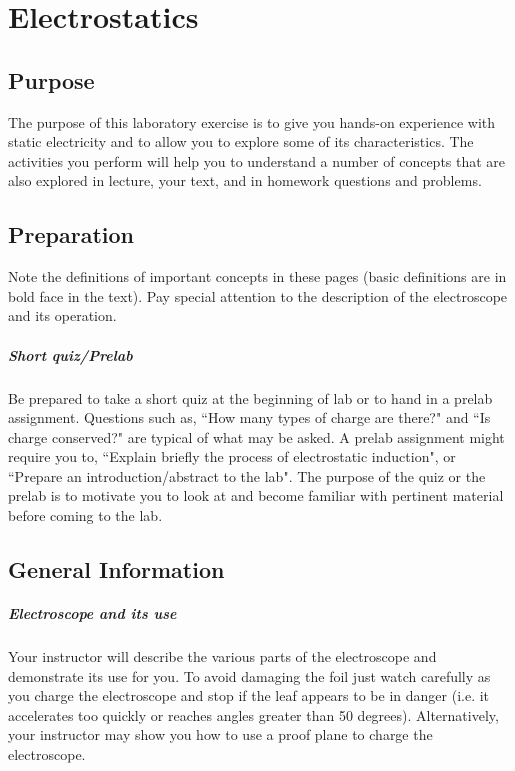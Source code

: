 
\chapter{Electrostatics}

\section{Purpose}
The purpose of this laboratory exercise is to give you hands-on experience with static electricity and to allow you to explore some of its characteristics.  The activities you perform will help you to understand a number of concepts that are also explored in lecture, your text, and in homework questions and problems.
\section{Preparation}
 Note the definitions of important concepts in these pages (basic definitions are in bold face in the text).  Pay special attention to the description of the electroscope and its operation.
\paragraph{Short quiz/Prelab}
  Be prepared to take a short quiz at the beginning of lab or to hand in a prelab assignment.  Questions such as, ``How many types of charge are there?" and ``Is charge conserved?" are typical of what may be asked.  A prelab assignment might require you to, ``Explain briefly the process of electrostatic induction", or  ``Prepare an introduction/abstract to the lab". The purpose of the quiz or the prelab is to motivate you to look at and become familiar with pertinent material before coming to the lab.
\section{General Information}
\paragraph{Electroscope and its use} 
Your instructor will describe the various parts of the electroscope and demonstrate its use for you. To avoid damaging the foil just watch carefully as you charge the electroscope and stop if the leaf appears to be in danger (i.e. it accelerates too quickly or reaches angles greater than 50 degrees).  Alternatively, your instructor may show you how to use a proof plane to charge the electroscope.

